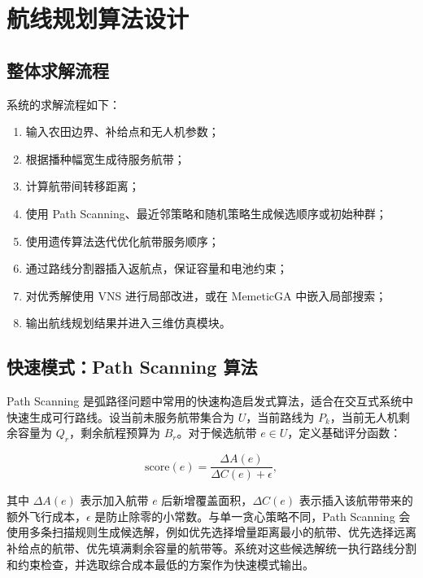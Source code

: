\documentclass[UTF8,a4paper,12pt]{ctexart}
\begin{document}
\section{航线规划算法设计}

\subsection{整体求解流程}

系统的求解流程如下：

\begin{enumerate}
    \item 输入农田边界、补给点和无人机参数；
    \item 根据播种幅宽生成待服务航带；
    \item 计算航带间转移距离；
    \item 使用 Path Scanning、最近邻策略和随机策略生成候选顺序或初始种群；
    \item 使用遗传算法迭代优化航带服务顺序；
    \item 通过路线分割器插入返航点，保证容量和电池约束；
    \item 对优秀解使用 VNS 进行局部改进，或在 MemeticGA 中嵌入局部搜索；
    \item 输出航线规划结果并进入三维仿真模块。
\end{enumerate}

\subsection{快速模式：Path Scanning 算法}

Path Scanning 是弧路径问题中常用的快速构造启发式算法，适合在交互式系统中快速生成可行路线。设当前未服务航带集合为 \(U\)，当前路线为 \(P_k\)，当前无人机剩余容量为 \(Q_r\)，剩余航程预算为 \(B_r\)。对于候选航带 \(e\in U\)，定义基础评分函数：

\[
\text{score}(e)=\frac{\Delta A(e)}{\Delta C(e)+\epsilon},
\]

其中 \(\Delta A(e)\) 表示加入航带 \(e\) 后新增覆盖面积，\(\Delta C(e)\) 表示插入该航带带来的额外飞行成本，\(\epsilon\) 是防止除零的小常数。与单一贪心策略不同，Path Scanning 会使用多条扫描规则生成候选解，例如优先选择增量距离最小的航带、优先选择远离补给点的航带、优先填满剩余容量的航带等。系统对这些候选解统一执行路线分割和约束检查，并选取综合成本最低的方案作为快速模式输出。
\end{document}
